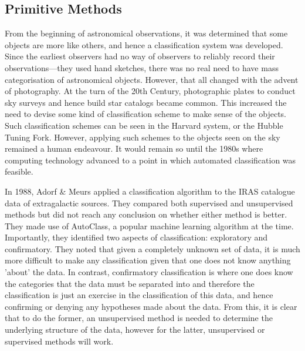 \documentclass[a4paper,11pt]{article}
\begin{document}
\subsection{Primitive Methods}
From the beginning of astronomical observations, it was determined that some objects are more like others, and hence a classification system was developed. Since the earliest observers had no way of observers to reliably record their observations—they used hand sketches, there was no real need to have mass categorisation of astronomical objects. However, that all changed with the advent of photography. At the turn of the 20th Century, photographic plates to conduct sky surveys and hence build star catalogs became common. This increased the need to devise some kind of classification scheme to make sense of the objects. Such classification schemes can be seen in the Harvard system, or the Hubble Tuning Fork. However, applying such schemes to the objects seen on the sky remained a human endeavour. It would remain so until the 1980s where computing technology advanced to a point in which automated classification was feasible.

In 1988, Adorf \& Meurs applied a classification algorithm to the IRAS catalogue data of extragalactic sources.\cite{adorf_1988_supervised} They compared both supervised and unsupervised methods but did not reach any conclusion on whether either method is better. They made use of AutoClass, a popular machine learning  algorithm at the time. Importantly, they identified two aspects of classification: exploratory and confirmatory. They noted that given a completely unknown set of data, it is much more difficult to make any classification given that one does not know anything 'about' the data. In contrast, confirmatory classification is where one does know the categories that the data must be separated into and therefore the classification is just an exercise in the classification of this data, and hence confirming or denying any hypotheses made about the data. From this, it is clear that to do the former, an unsupervised method is needed to determine the underlying structure of the data, however for the latter, unsupervised or supervised methods will work.
\end{document}
